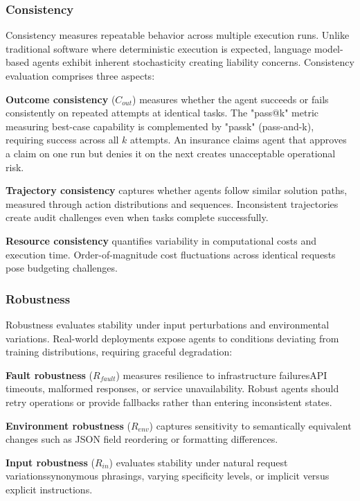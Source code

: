 \subsubsection{Consistency}

Consistency measures repeatable behavior across multiple execution runs. Unlike traditional software where deterministic execution is expected, language model-based agents exhibit inherent stochasticity creating liability concerns. Consistency evaluation comprises three aspects:

\textbf{Outcome consistency} ($C_{out}$) measures whether the agent succeeds or fails consistently on repeated attempts at identical tasks. The "pass@k" metric measuring best-case capability is complemented by "passk" (pass-and-k), requiring success across all $k$ attempts. An insurance claims agent that approves a claim on one run but denies it on the next creates unacceptable operational risk.

\textbf{Trajectory consistency} captures whether agents follow similar solution paths, measured through action distributions and sequences. Inconsistent trajectories create audit challenges even when tasks complete successfully.

\textbf{Resource consistency} quantifies variability in computational costs and execution time. Order-of-magnitude cost fluctuations across identical requests pose budgeting challenges.

\subsubsection{Robustness}

Robustness evaluates stability under input perturbations and environmental variations. Real-world deployments expose agents to conditions deviating from training distributions, requiring graceful degradation:

\textbf{Fault robustness} ($R_{fault}$) measures resilience to infrastructure failuresAPI timeouts, malformed responses, or service unavailability. Robust agents should retry operations or provide fallbacks rather than entering inconsistent states.

\textbf{Environment robustness} ($R_{env}$) captures sensitivity to semantically equivalent changes such as JSON field reordering or formatting differences.

\textbf{Input robustness} ($R_{in}$) evaluates stability under natural request variationssynonymous phrasings, varying specificity levels, or implicit versus explicit instructions.

